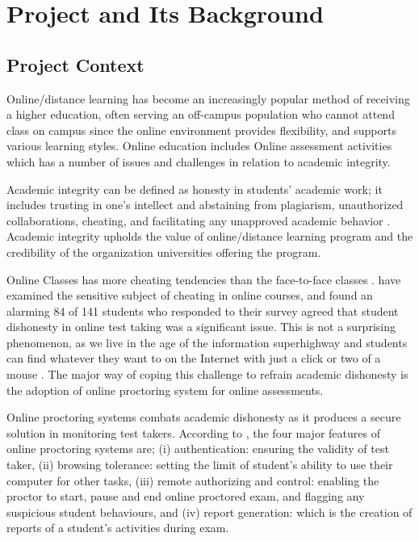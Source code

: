 \chapter{Project and Its Background}

\section{Project Context}

Online/distance learning has become an increasingly popular method of receiving a higher education, often serving an off-campus population who cannot attend class on campus \cite{daffin2018comparing} since the online environment provides flexibility, and supports various learning styles.
Online education includes Online assessment activities which has a number of issues and challenges in relation to academic integrity.

Academic integrity can be defined as honesty in students' academic work; it includes trusting in one’s intellect and abstaining from plagiarism, unauthorized collaborations, cheating, and facilitating any unapproved academic behavior \cite{cronan2017changing}.
Academic integrity upholds the value of online/distance learning program and the credibility of the organization universities offering the program.

Online Classes has more cheating tendencies than the face-to-face classes \cite{watson2010cheating}.
 have examined the sensitive subject of cheating in online courses, and found an alarming 84 of 141 students who responded to their survey agreed that student dishonesty in online test taking was a significant issue.
This is not a surprising phenomenon, as we live in the age of the information superhighway and students can find whatever they want to on the Internet with just a click or two of a mouse \cite{daffin2018comparing}.
The major way of coping this challenge to refrain academic dishonesty is the adoption of online proctoring system for online assessments.

Online proctoring systems combats academic dishonesty as it produces a secure solution in monitoring test takers.
According to , the four major features of online proctoring systems are; (i) authentication: ensuring the validity of test taker, (ii) browsing tolerance: setting the limit of student’s ability to use their computer for other tasks, (iii) remote authorizing and control: enabling the proctor to start, pause and end online proctored exam, and flagging any suspicious student behaviours, and (iv) report generation: which is the creation of reports of a student’s activities during exam.

